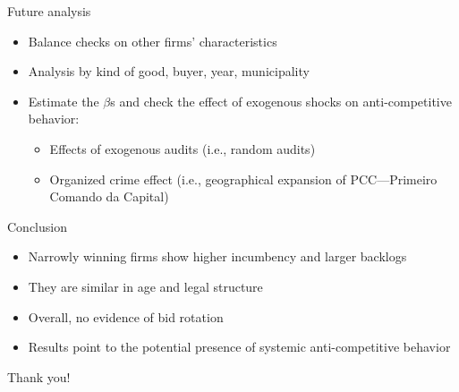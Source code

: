 \documentclass[12pt,english,xcolor=dvipsnames,aspectratio=1610]{beamer}
\begin{document}
\begin{frame}{Future analysis}
 \begin{itemize}
        \item Balance checks on other firms' characteristics
        \item Analysis by kind of good, buyer, year, municipality\vspace{2mm}
        \item Estimate the $\beta$s and check the effect of exogenous shocks on anti-competitive behavior:\vspace{2mm}
        \begin{itemize}
            \item Effects of exogenous audits (i.e., random audits)\vspace{2mm}
            \item Organized crime effect (i.e., geographical expansion of PCC—Primeiro Comando da Capital)
        \end{itemize}
    \end{itemize}
\end{frame}



\begin{frame}{Conclusion}
    \begin{itemize}
        \item Narrowly winning firms show higher incumbency and larger backlogs
        \item They are similar in age and legal structure 
        \item Overall, no evidence of bid rotation
        \item Results point to the potential presence of systemic anti-competitive behavior
    \end{itemize}
\end{frame}


\begin{frame}
\begin{center}
    \Huge Thank you!
\end{center}
\end{frame}
\end{document}
